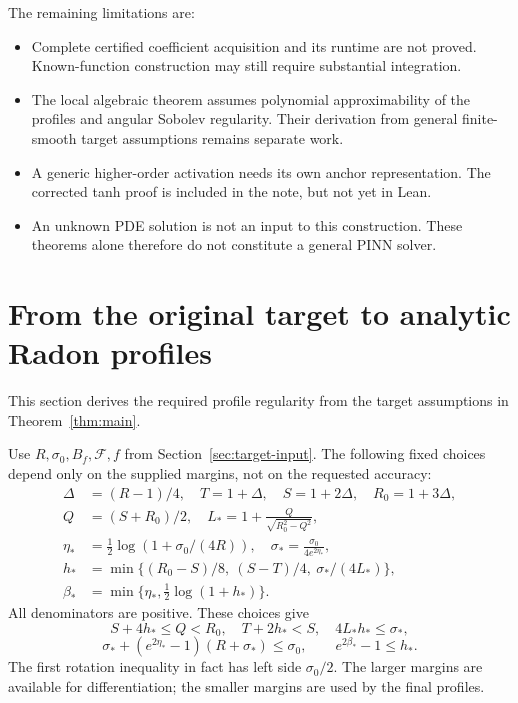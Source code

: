 \documentclass[11pt,letterpaper]{article}
\theoremstyle{definition}
\theoremstyle{remark}
\begin{document}
The remaining limitations are:
\begin{itemize}
\item Complete certified coefficient acquisition and its runtime are not proved.
      Known-function construction may still require substantial integration.
\item The local algebraic theorem assumes polynomial approximability of the
      profiles and angular Sobolev regularity. Their derivation from general
      finite-smooth target assumptions remains separate work.
\item A generic higher-order activation needs its own anchor representation.
      The corrected tanh proof is included in the note, but not yet in Lean.
\item An unknown PDE solution is not an input to this construction.
      These theorems alone therefore do not constitute a general PINN solver.
\end{itemize}


\clearpage
\appendix
\section{From the original target to analytic Radon profiles}\label{sec:source}
This section derives the required profile regularity from the target
assumptions in Theorem~\ref{thm:main}.

Use \(R,\sigma_0,B_f,\mathcal F,f\) from Section~\ref{sec:target-input}. The following fixed choices
depend only on the supplied margins, not on the requested accuracy:
\begin{align}
 \Delta&=(R-1)/4,\quad T=1+\Delta,\quad S=1+2\Delta,\quad R_0=1+3\Delta,\nonumber\\
 Q&=(S+R_0)/2,\quad L_*=1+\frac{Q}{\sqrt{R_0^2-Q^2}},\nonumber\\
 \eta_*&=\tfrac12\log(1+\sigma_0/(4R)),\quad
 \sigma_*=\frac{\sigma_0}{4e^{2\eta_*}},\nonumber\\
 h_*&=\min\{(R_0-S)/8,\ (S-T)/4,\ \sigma_* /(4L_*)\},\nonumber\\
 \beta_*&=\min\{\eta_*,\tfrac12\log(1+h_*)\}.\label{eq:source-choice}
\end{align}
All denominators are positive. These choices give
\[
 S+4h_*\le Q<R_0,\quad T+2h_*<S,\quad 4L_*h_*\le\sigma_*,
\]
\[
 \sigma_*+(e^{2\eta_*}-1)(R+\sigma_*)\le\sigma_0,\qquad
 e^{2\beta_*}-1\le h_*.
\]
The first rotation inequality in fact has left side \(\sigma_0/2\).
The larger margins are available for differentiation; the smaller margins
are used by the final profiles.
\end{document}
